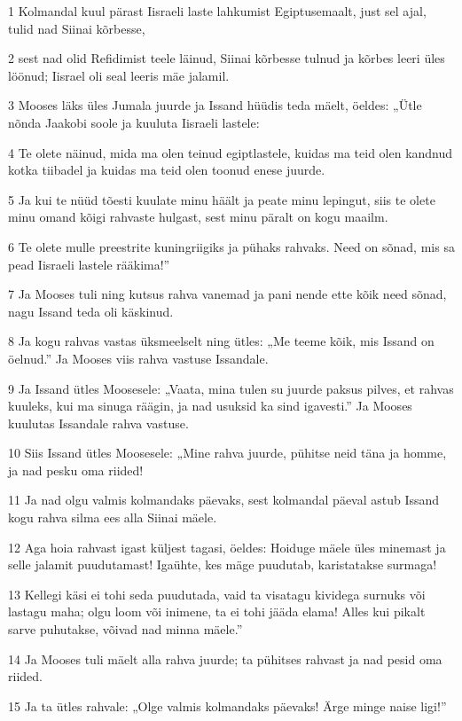 \par 1 Kolmandal kuul pärast Iisraeli laste lahkumist Egiptusemaalt, just sel ajal, tulid nad Siinai kõrbesse,
\par 2 sest nad olid Refidimist teele läinud, Siinai kõrbesse tulnud ja kõrbes leeri üles löönud; Iisrael oli seal leeris mäe jalamil.
\par 3 Mooses läks üles Jumala juurde ja Issand hüüdis teda mäelt, öeldes: „Ütle nõnda Jaakobi soole ja kuuluta Iisraeli lastele:
\par 4 Te olete näinud, mida ma olen teinud egiptlastele, kuidas ma teid olen kandnud kotka tiibadel ja kuidas ma teid olen toonud enese juurde.
\par 5 Ja kui te nüüd tõesti kuulate minu häält ja peate minu lepingut, siis te olete minu omand kõigi rahvaste hulgast, sest minu päralt on kogu maailm.
\par 6 Te olete mulle preestrite kuningriigiks ja pühaks rahvaks. Need on sõnad, mis sa pead Iisraeli lastele rääkima!”
\par 7 Ja Mooses tuli ning kutsus rahva vanemad ja pani nende ette kõik need sõnad, nagu Issand teda oli käskinud.
\par 8 Ja kogu rahvas vastas üksmeelselt ning ütles: „Me teeme kõik, mis Issand on öelnud.” Ja Mooses viis rahva vastuse Issandale.
\par 9 Ja Issand ütles Moosesele: „Vaata, mina tulen su juurde paksus pilves, et rahvas kuuleks, kui ma sinuga räägin, ja nad usuksid ka sind igavesti.” Ja Mooses kuulutas Issandale rahva vastuse.
\par 10 Siis Issand ütles Moosesele: „Mine rahva juurde, pühitse neid täna ja homme, ja nad pesku oma riided!
\par 11 Ja nad olgu valmis kolmandaks päevaks, sest kolmandal päeval astub Issand kogu rahva silma ees alla Siinai mäele.
\par 12 Aga hoia rahvast igast küljest tagasi, öeldes: Hoiduge mäele üles minemast ja selle jalamit puudutamast! Igaühte, kes mäge puudutab, karistatakse surmaga!
\par 13 Kellegi käsi ei tohi seda puudutada, vaid ta visatagu kividega surnuks või lastagu maha; olgu loom või inimene, ta ei tohi jääda elama! Alles kui pikalt sarve puhutakse, võivad nad minna mäele.”
\par 14 Ja Mooses tuli mäelt alla rahva juurde; ta pühitses rahvast ja nad pesid oma riided.
\par 15 Ja ta ütles rahvale: „Olge valmis kolmandaks päevaks! Ärge minge naise ligi!”
